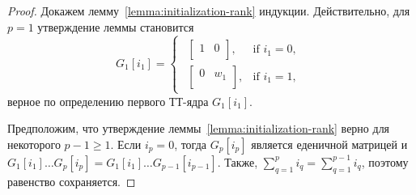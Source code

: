 \begin{proof}
  Докажем лемму~\ref{lemma:initialization-rank} индукции. Действительно, для $p = 1$ утверждение леммы становится
  \begin{equation*}
    G_1[i_1] =
    \begin{cases*}
        \begin{array}{ll}
        \left[
        \begin{array}{cc}
        1 & 0\\
        \end{array}
        \right], & \text{if } i_1 = 0,\\[0.1cm]
        \left[
        \begin{array}{cc}
        0 & w_1\\
        \end{array}
        \right], & \text{if } i_1 = 1,
    \end{array}
    \end{cases*}
  \end{equation*}
  верное по определению первого ТТ-ядра $G_1[i_1]$.

  Предположим, что утверждение леммы~\ref{lemma:initialization-rank} верно для некоторого $p - 1 \geq 1$.
  Если $i_p = 0$, тогда $G_p[i_p]$ является еденичной матрицей и $G_1[i_1] \ldots G_p[i_p] = G_1[i_1] \ldots G_{p-1}[i_{p-1}]$. Также, $\sum_{q=1}^p i_q = \sum_{q=1}^{p-1}  i_q$, поэтому равенство сохраняется.


\end{proof}
